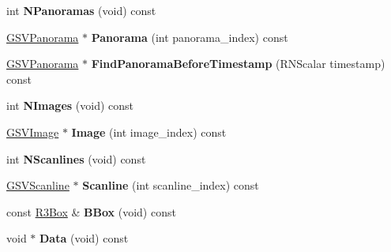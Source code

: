 \begin{DoxyCompactItemize}
\item 
int {\bfseries N\+Panoramas} (void) const \hypertarget{class_g_s_v_segment_a1581945d0b9ae92d3b1b98f48229d827}{}\label{class_g_s_v_segment_a1581945d0b9ae92d3b1b98f48229d827}

\item 
\hyperlink{class_g_s_v_panorama}{G\+S\+V\+Panorama} $\ast$ {\bfseries Panorama} (int panorama\+\_\+index) const \hypertarget{class_g_s_v_segment_ade5e8f913a07d329e0a0db19d0a39360}{}\label{class_g_s_v_segment_ade5e8f913a07d329e0a0db19d0a39360}

\item 
\hyperlink{class_g_s_v_panorama}{G\+S\+V\+Panorama} $\ast$ {\bfseries Find\+Panorama\+Before\+Timestamp} (R\+N\+Scalar timestamp) const \hypertarget{class_g_s_v_segment_afd4008d1fa3cf7d66408aaf501cd2264}{}\label{class_g_s_v_segment_afd4008d1fa3cf7d66408aaf501cd2264}

\item 
int {\bfseries N\+Images} (void) const \hypertarget{class_g_s_v_segment_a82dd36e60b1f291cb504d5e054b7c8c3}{}\label{class_g_s_v_segment_a82dd36e60b1f291cb504d5e054b7c8c3}

\item 
\hyperlink{class_g_s_v_image}{G\+S\+V\+Image} $\ast$ {\bfseries Image} (int image\+\_\+index) const \hypertarget{class_g_s_v_segment_a7d2763da3c51757489a2307e2d406b88}{}\label{class_g_s_v_segment_a7d2763da3c51757489a2307e2d406b88}

\item 
int {\bfseries N\+Scanlines} (void) const \hypertarget{class_g_s_v_segment_a9f16b62dc91eb33a217323e8f58d520b}{}\label{class_g_s_v_segment_a9f16b62dc91eb33a217323e8f58d520b}

\item 
\hyperlink{class_g_s_v_scanline}{G\+S\+V\+Scanline} $\ast$ {\bfseries Scanline} (int scanline\+\_\+index) const \hypertarget{class_g_s_v_segment_aa1604a3b96309328acabd19ad6c2bdd1}{}\label{class_g_s_v_segment_aa1604a3b96309328acabd19ad6c2bdd1}

\item 
const \hyperlink{class_r3_box}{R3\+Box} \& {\bfseries B\+Box} (void) const \hypertarget{class_g_s_v_segment_a58eb15a03bf80492bc333aa34a42ec94}{}\label{class_g_s_v_segment_a58eb15a03bf80492bc333aa34a42ec94}

\item 
void $\ast$ {\bfseries Data} (void) const \hypertarget{class_g_s_v_segment_a9b5da15263ee1fdd91a0b1dbade83bd4}{}\label{class_g_s_v_segment_a9b5da15263ee1fdd91a0b1dbade83bd4}


\end{DoxyCompactItemize}
